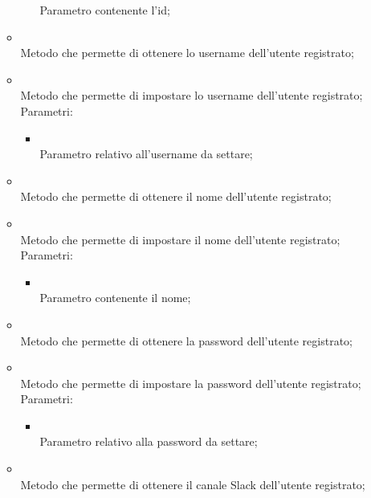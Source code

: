 \begin{itemize}
\begin{itemize}
\begin{itemize}
			Parametro contenente l'id;
		\end{itemize}
		\item[]  \\
		Metodo che permette di ottenere lo username dell'utente registrato;\\
		\item[]  \\
		Metodo che permette di impostare lo username dell'utente registrato;\\
		Parametri:
		\begin{itemize}
			\item {} \\
			Parametro relativo all'username da settare;
		\end{itemize}
		\item[]  \\
		Metodo che permette di ottenere il nome dell'utente registrato;\\
		\item[]  \\
		Metodo che permette di impostare il nome dell'utente registrato;\\
		Parametri:
		\begin{itemize}
			\item {} \\
			Parametro contenente il nome;
		\end{itemize}
		\item[]  \\
		Metodo che permette di ottenere la password dell'utente registrato;\\
		\item[]  \\
		Metodo che permette di impostare la password dell'utente registrato;\\
		Parametri:
		\begin{itemize}
			\item {} \\
			Parametro relativo alla password da settare;
		\end{itemize}
		\item[]  \\
		Metodo che permette di ottenere il canale Slack dell'utente registrato;\\

\end{itemize}
\end{itemize}
